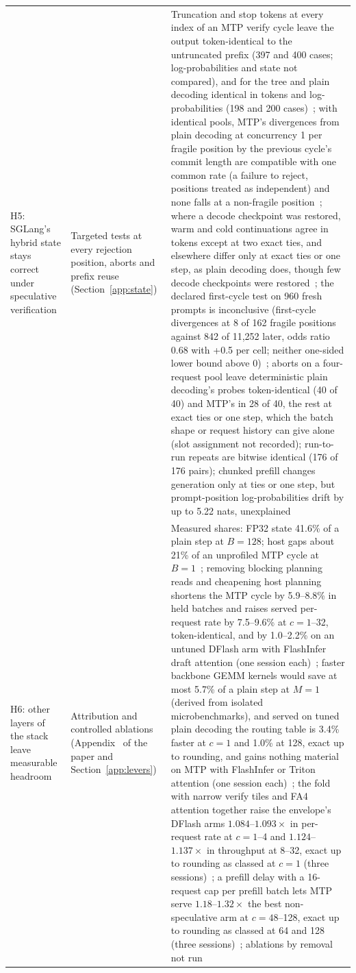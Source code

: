 {\begin{longtable}{@{}P{5.2cm}P{4.6cm}P{6.5cm}@{}}
H5: SGLang's hybrid state stays correct under speculative verification & Targeted tests at every rejection position, aborts and prefix reuse (Section~\ref{app:state}) & Truncation and stop tokens at every index of an MTP verify cycle leave the output token-identical to the untruncated prefix (397 and 400 cases; log-probabilities and state not compared), and for the tree and plain decoding identical in tokens and log-probabilities (198 and 200 cases)~; with identical pools, MTP's divergences from plain decoding at concurrency 1 per fragile position by the previous cycle's commit length are compatible with one common rate (a failure to reject, positions treated as independent) and none falls at a non-fragile position~; where a decode checkpoint was restored, warm and cold continuations agree in tokens except at two exact ties, and elsewhere differ only at exact ties or one step, as plain decoding does, though few decode checkpoints were restored~; the declared first-cycle test on 960 fresh prompts is inconclusive (first-cycle divergences at 8 of 162 fragile positions against 842 of 11,252 later, odds ratio 0.68 with +0.5 per cell; neither one-sided lower bound above 0)~; aborts on a four-request pool leave deterministic plain decoding's probes token-identical (40 of 40) and MTP's in 28 of 40, the rest at exact ties or one step, which the batch shape or request history can give alone (slot assignment not recorded); run-to-run repeats are bitwise identical (176 of 176 pairs); chunked prefill changes generation only at ties or one step, but prompt-position log-probabilities drift by up to 5.22 nats, unexplained~\\
H6: other layers of the stack leave measurable headroom & Attribution and controlled ablations (Appendix~ of the paper and Section~\ref{app:levers}) & Measured shares: FP32 state 41.6\% of a plain step at $B=128$; host gaps about 21\% of an unprofiled MTP cycle at $B=1$~; removing blocking planning reads and cheapening host planning shortens the MTP cycle by 5.9--8.8\% in held batches and raises served per-request rate by 7.5--9.6\% at $c=1$--32, token-identical, and by 1.0--2.2\% on an untuned DFlash arm with FlashInfer draft attention (one session each)~; faster backbone GEMM kernels would save at most 5.7\% of a plain step at $M=1$ (derived from isolated microbenchmarks), and served on tuned plain decoding the routing table is 3.4\% faster at $c=1$ and 1.0\% at 128, exact up to rounding, and gains nothing material on MTP with FlashInfer or Triton attention (one session each)~; the fold with narrow verify tiles and FA4 attention together raise the envelope's DFlash arms $1.084$--$1.093\times$ in per-request rate at $c=1$--4 and $1.124$--$1.137\times$ in throughput at 8--32, exact up to rounding as classed at $c=1$ (three sessions)~; a prefill delay with a 16-request cap per prefill batch lets MTP serve $1.18$--$1.32\times$ the best non-speculative arm at $c=48$--128, exact up to rounding as classed at 64 and 128 (three sessions)~; ablations by removal not run\\

\end{longtable}}
